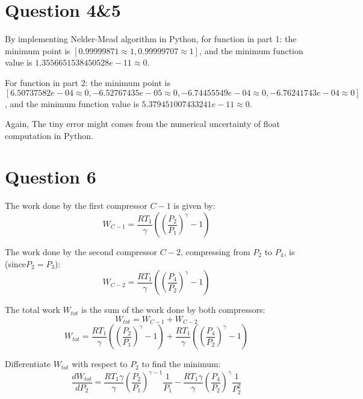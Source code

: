 \documentclass[a4paper,12pt]{article} %
\begin{document}
\section*{\textbf{Question 4\&5}}
By implementing Nelder-Mead algorithm in Python, for function in part 1: the minimum point is $[0.99999871\approx 1, 0.99999707\approx 1]$, and the
minimum function value is $1.3556651538450528e-11 \approx 0 $.

For function in part 2: the minimum point is $[ 6.50737582e-04\approx 0, -6.52767435e-05\approx 0, -6.74455549e-04\approx 0, -6.76241743e-04\approx 0]$, and the
minimum function value is $5.379451007433241e-11 \approx 0 $.

Again, The tiny error might comes from the numerical uncertainty of float computation in Python.

\section*{\textbf{Question 6}}

The work done by the first compressor \( C-1 \) is given by:
\begin{equation}
W_{C-1} = \frac{RT_1}{\gamma} \left( \left( \frac{P_2}{P_1} \right)^\gamma - 1 \right)
\end{equation}

The work done by the second compressor \( C-2 \), compressing from \( P_2 \) to \( P_4 \), is (since$P_2 = P_3$):
\begin{equation}
W_{C-2} = \frac{RT_1}{\gamma} \left( \left( \frac{P_4}{P_2} \right)^\gamma - 1 \right)
\end{equation}

The total work \( W_{tot} \) is the sum of the work done by both compressors:
\begin{equation}
W_{tot} = W_{C-1} + W_{C-2}
\end{equation}
\begin{equation}
W_{tot} = \frac{RT_1}{\gamma} \left( \left( \frac{P_2}{P_1} \right)^\gamma - 1 \right) + \frac{RT_1}{\gamma} \left( \left( \frac{P_4}{P_2} \right)^\gamma - 1 \right)
\end{equation}

Differentiate \( W_{tot} \) with respect to \( P_2 \) to find the minimum:
\begin{equation}
\frac{dW_{tot}}{dP_2} = \frac{RT_1 \gamma}{\gamma} \left( \frac{P_2}{P_1} \right)^{\gamma-1} \frac{1}{P_1} - \frac{RT_1 \gamma}{\gamma} \left( \frac{P_4}{P_2} \right)^{\gamma} \frac{1}{P_2^2}
\end{equation}
\end{document}
